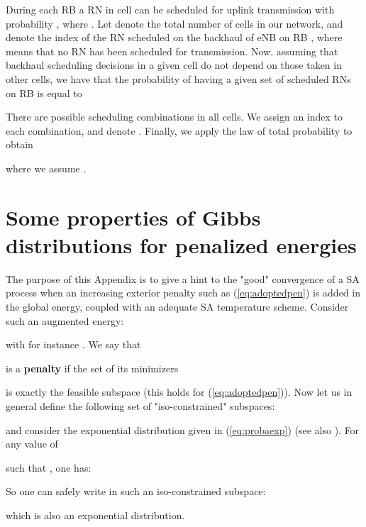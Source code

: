 \documentclass[draftcls,onecolumn]{IEEEtran}
\theoremstyle{plain}
\theoremstyle{definition}
\begin{document}
During each RB  a RN  in cell  can be scheduled for uplink transmission with probability 
,
where .
Let  denote the total number of cells in our network, and  denote the index of the RN scheduled on the backhaul of eNB  on RB , where  means that no RN has been scheduled for transmission. 
Now, assuming that backhaul scheduling decisions in a given cell do not depend on those taken in other cells, we have that the probability of having a given set  of scheduled RNs on RB  is equal to 

There are  possible scheduling combinations in all cells. We assign an index  to each combination, and denote . 
Finally, we apply the law of total probability to obtain

where we assume .




\section{Some properties of Gibbs distributions for penalized energies} \label{app:gibbs}


The purpose of this Appendix is to give a hint to the "good" convergence 
of a SA process when an increasing exterior penalty 
such as (\ref{eq:adoptedpen}) is added in the global energy, 
coupled with an adequate SA temperature scheme. 
Consider such an augmented energy:

with for instance .
We say that 
 
is a {\bf penalty} if the set of its minimizers

is exactly the feasible subspace 
(this holds for 
(\ref{eq:adoptedpen})). Now let us in general define the following set of "iso-constrained" subspaces:

and consider the exponential distribution
given in (\ref{eq:probaexp}) (see also \cite{geman-graffigne}).
For any value of
 
such that
,
one has:

So one can safely write in such an iso-constrained subspace:

which is also an exponential distribution. 
\end{document}

